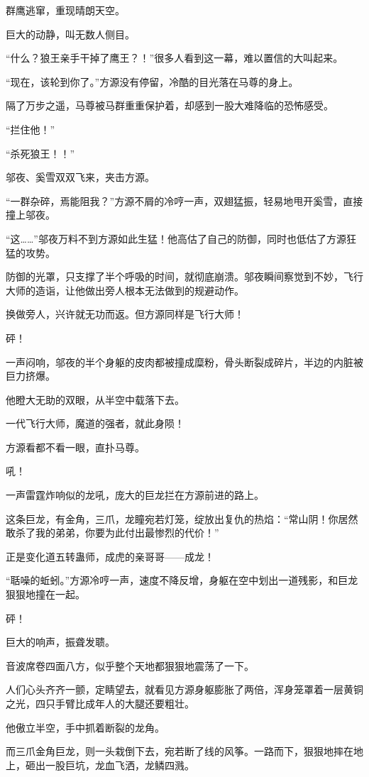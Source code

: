 \begin{this_body}
群鹰逃窜，重现晴朗天空。

巨大的动静，叫无数人侧目。

“什么？狼王亲手干掉了鹰王？！”很多人看到这一幕，难以置信的大叫起来。

“现在，该轮到你了。”方源没有停留，冷酷的目光落在马尊的身上。

隔了万步之遥，马尊被马群重重保护着，却感到一股大难降临的恐怖感受。

“拦住他！”

“杀死狼王！！”

邬夜、奚雪双双飞来，夹击方源。

“一群杂碎，焉能阻我？”方源不屑的冷哼一声，双翅猛振，轻易地甩开奚雪，直接撞上邬夜。

“这……”邬夜万料不到方源如此生猛！他高估了自己的防御，同时也低估了方源狂猛的攻势。

防御的光罩，只支撑了半个呼吸的时间，就彻底崩溃。邬夜瞬间察觉到不妙，飞行大师的造诣，让他做出旁人根本无法做到的规避动作。

换做旁人，兴许就无功而返。但方源同样是飞行大师！

砰！

一声闷响，邬夜的半个身躯的皮肉都被撞成糜粉，骨头断裂成碎片，半边的内脏被巨力挤爆。

他瞪大无助的双眼，从半空中载落下去。

一代飞行大师，魔道的强者，就此身陨！

方源看都不看一眼，直扑马尊。

吼！

一声雷霆炸响似的龙吼，庞大的巨龙拦在方源前进的路上。

这条巨龙，有金角，三爪，龙瞳宛若灯笼，绽放出复仇的热焰：“常山阴！你居然敢杀了我的弟弟，你要为此付出最惨烈的代价！”

正是变化道五转蛊师，成虎的亲哥哥——成龙！

“聒噪的蚯蚓。”方源冷哼一声，速度不降反增，身躯在空中划出一道残影，和巨龙狠狠地撞在一起。

砰！

巨大的响声，振聋发聩。

音波席卷四面八方，似乎整个天地都狠狠地震荡了一下。

人们心头齐齐一颤，定睛望去，就看见方源身躯膨胀了两倍，浑身笼罩着一层黄铜之光，四只手臂比成年人的大腿还要粗壮。

他傲立半空，手中抓着断裂的龙角。

而三爪金角巨龙，则一头栽倒下去，宛若断了线的风筝。一路而下，狠狠地摔在地上，砸出一股巨坑，龙血飞洒，龙鳞四溅。


\end{this_body}
